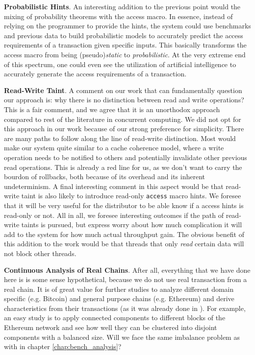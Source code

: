 \textbf{Probabilistic Hints}. An interesting addition to the previous point would the mixing of
probability theorems with the access macro. In essence, instead of relying on the programmer to
provide the hints, the system could use benchmarks and previous data to build probabilistic models
to accurately predict the access requirements of a transaction given specific inputs.  This
basically transforms the access macro from being (pseudo)\textit{static} to \textit{probabilistic}.
At the very extreme end of this spectrum, one could even see the utilization of artificial
intelligence to accurately generate the access requirements of a transaction.

\textbf{Read-Write Taint}. A comment on our work that can fundamentally question our approach is:
why there is no distinction between read and write operations? This is a fair comment, and we agree
that it is an unorthodox approach compared to rest of the literature in concurrent computing. We did
not opt for this approach in our work because of our strong preference for simplicity. There are
many paths to follow along the line of read-write distinction. Most would make our system quite
similar to a cache coherence model, where a write operation needs to be notified to others and
potentially invalidate other previous read operations. This is already a red line for us, as we
don't want to carry the bourdon of rollbacks, both because of its overhead and its inherent
undeterminism. A final interesting comment in this aspect would be that read-write taint is also
likely to introduce read-only \texttt{access} macro hints. We foresee that it will be very useful
for the distributor to be able know if a access hints is read-only or not. All in all, we foresee
interesting outcomes if the path of read-write taints is pursued, but express worry about how much
complication it will add to the system for how much actual throughput gain. The obvious benefit of
this addition to the work would be that threads that only \textit{read} certain data will not block
other threads.


\textbf{Continuous Analysis of Real Chains}. After all, everything that we have done here is is some
sense hypothetical, because we do not use real transaction from a real chain. It is of great value
for further studies to analyze different domain specific (e.g. Bitcoin) and general purpose chains
(e.g. Ethereum) and derive characteristics from their transactions (as it was already done in
\cite{saraphEmpiricalStudySpeculative2019}). For example, an easy study is to apply connected
components to different blocks of the Ethereum network and see how well they can be clustered into
disjoint components with a balanced size. Will we face the same imbalance problem as with in chapter
\ref{chap:bench_analysis}?

